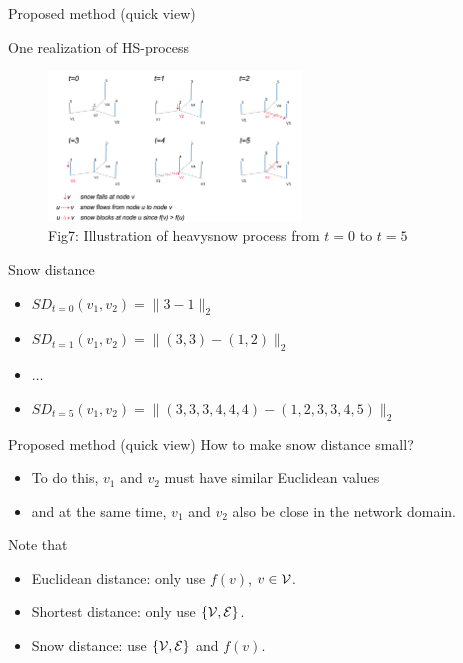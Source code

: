 \documentclass[
  ignorenonframetext,
]{beamer}
\providecommand{\tightlist}{%
  \setlength{\itemsep}{0pt}\setlength{\parskip}{0pt}}\usepackage{longtable,booktabs,array}
\begin{document}
\begin{frame}{Proposed method (quick view)}
\label{proposed-method-quick-view-3}
\begin{block}{One realization of HS-process}
\begin{figure}[H]

{\centering \includegraphics[width=0.6\textwidth,height=\textheight]{Beamer_files/figure-beamer/31efed2e-6ef1-4cf7-b2a6-d7bdbbcd7921-1-defed998-98ea-4c5a-ae0a-bd497d104889.png}

}

\caption{Fig7: Illustration of heavysnow process from \(t=0\) to
\(t=5\)}

\end{figure}%
\end{block}

\begin{block}{Snow distance}
\begin{itemize}
\tightlist
\item
  \(SD_{t=0}(v_1,v_2)=\|3-1\|_2\)
\item
  \(SD_{t=1}(v_1,v_2)=\|(3,3)-(1,2)\|_2\)
\item
  \(\dots\)
\item
  \(SD_{t=5}(v_1,v_2)=\|(3,3,3,4,4,4)-(1,2,3,3,4,5)\|_2\)
\end{itemize}
\end{block}
\end{frame}

\begin{frame}{Proposed method (quick view)}
\label{proposed-method-quick-view-4}
How to make snow distance small?

\begin{itemize}
\tightlist
\item
  To do this, \(v_1\) and \(v_2\) must have similar Euclidean values
\item
  and at the same time, \(v_1\) and \(v_2\) also be close in the network
  domain.
\end{itemize}

Note that

\begin{itemize}
\tightlist
\item
  Euclidean distance: only use \(f(v)\), \(v \in {\cal V}\).
\item
  Shortest distance: only use \(\{{\cal V}, {\cal E}\}\).
\item
  Snow distance: use \(\{{\cal V}, {\cal E}\}\) and \(f(v)\).
\end{itemize}
\end{frame}
\end{document}
